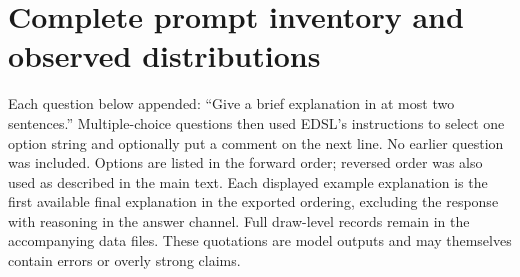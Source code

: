 \documentclass[11pt,letterpaper]{article}
\begin{document}
\section{Complete prompt inventory and observed distributions}
Each question below appended: ``Give a brief explanation in at most two
sentences.'' Multiple-choice questions then used EDSL's instructions to select
one option string and optionally put a comment on the next line. No earlier
question was included. Options are listed in the forward order; reversed
order was also used as described in the main text. Each displayed example
explanation is the first available final explanation in the exported ordering,
excluding the response with reasoning in the answer channel. Full draw-level
records remain in the accompanying data files. These quotations are model
outputs and may themselves contain errors or overly strong claims.


\end{document}
